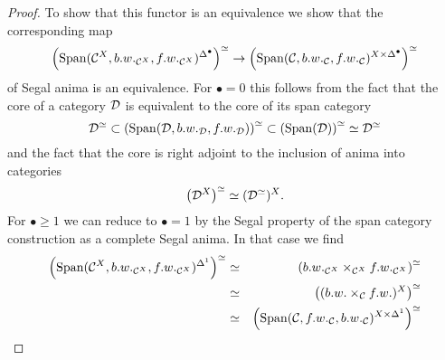 \begin{proof}
    To show that this functor is an equivalence we show that the corresponding map 
    \[
        \left( \operatorname{Span}(\mathcal{C}^X, b.w._{\mathcal{C}^X}, f.w._{\mathcal{C}^X})^{\Delta^\bullet}\right)^\simeq \to \left(\operatorname{Span}(\mathcal{C},b.w._{\mathcal{C}}, f.w._{\mathcal{C}})^{X \times \Delta^\bullet}\right)^\simeq
    \]
    of Segal anima is an equivalence.
    For $\bullet = 0$ this follows from the fact that the core of a category $\mathcal{D}$ is equivalent to the core of its span category 
    \[
        \mathcal{D}^\simeq \subset \left(\operatorname{Span}(\mathcal{D}, b.w._{\mathcal{D}}, f.w._{\mathcal{D}})\right)^\simeq \subset \left(\operatorname{Span}(\mathcal{D})\right)^\simeq \simeq \mathcal{D}^\simeq 
    \]
    and the fact that the core is right adjoint to the inclusion of anima into categories
    \[
      \left(\mathcal{D}^X\right)^\simeq \simeq (\mathcal{D}^\simeq)^X.
    \]
    For $\bullet \geq 1$ we can reduce to $\bullet = 1$ by the Segal property of the span category construction as a complete Segal anima.
    In that case we find
    \begin{eqnarray*}
        \left(\operatorname{Span}(\mathcal{C}^X, b.w._{\mathcal{C}^X}, f.w._{\mathcal{C}^X} )^{\Delta^1}\right)^\simeq & \simeq & \left(b.w._{\mathcal{C}^X} \times_{\mathcal{C}^X}f.w._{\mathcal{C}^X}\right)^\simeq \\
        & \simeq & \left((b.w. \times_{\mathcal{C}} f.w.)^X\right)^\simeq \\
        & \simeq & \left(\operatorname{Span}(\mathcal{C},f.w._{\mathcal{C}}, b.w._{\mathcal{C}})^{X \times \Delta^1}\right)^\simeq
    \end{eqnarray*}

\end{proof}

